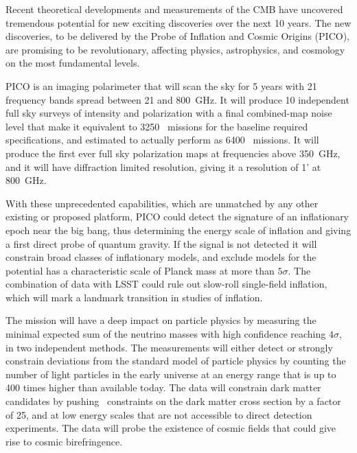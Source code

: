 \documentclass[PICOReport.tex]{subfiles}
\begin{document}
Recent theoretical developments and measurements of the \ac{CMB} have uncovered tremendous potential for new exciting discoveries over the next 10 years. The new discoveries, to be delivered by the Probe of Inflation and Cosmic Origins (PICO), are promising to be revolutionary, affecting physics, astrophysics, and cosmology on the most fundamental levels. 

PICO is an imaging polarimeter that will scan the sky for 5 years with 21 frequency bands spread between 21 and 800~GHz. It will produce 10 independent full sky surveys of intensity and polarization with a final combined-map noise level that make it equivalent to 3250 \planck\ missions for the baseline required specifications, and estimated to actually perform as 6400 \planck\ missions. It will produce the first ever full sky polarization maps at frequencies above 350~GHz, and it will have diffraction limited resolution, giving it a resolution of 1' at 800~GHz. 

With these unprecedented capabilities, which are unmatched by any other existing or proposed platform, PICO could detect the signature of an inflationary epoch near the big bang, thus determining the energy scale of inflation and giving a first direct probe of quantum gravity. If the signal is not detected it will constrain broad classes of inflationary models, and exclude models for the potential has a characteristic scale of Planck mass at more than $5\sigma$. The combination of data with LSST could rule out slow-roll single-field inflation, which will mark a landmark transition in studies of inflation. 

The mission will have a deep impact on particle physics by measuring the minimal expected sum of the neutrino masses with high confidence reaching $4\sigma$, in two independent methods. The measurements will either detect or strongly constrain deviations from the standard model of particle physics by counting the number of light particles in the early universe at an energy range that is up to 400 times higher than available today. The data will constrain dark matter candidates by pushing \planck\ constraints on the dark matter cross section by a factor of 25, and at low energy scales that are not accessible to direct detection experiments. The data will probe the existence of cosmic fields that could give rise to cosmic birefringence. 
\end{document}

